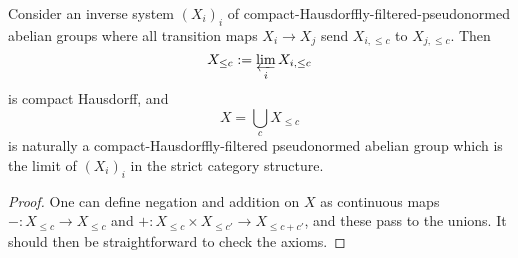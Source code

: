 \begin{proposition}
  \label{bounded-limits}
  \leanok
  Consider an inverse system $(X_i)_i$ of compact-Hausdorffly-filtered-pseudonormed abelian groups
  where all transition maps $X_i\to X_j$ send $X_{i,\leq c}$ to $X_{j,\leq c}$.
  Then
  \[ X_{\leq c} := \varprojlim_i X_{i,\leq c} \]
  is compact Hausdorff, and
  \[ X=\bigcup_c X_{\leq c} \]
  is naturally a compact-Hausdorffly-filtered pseudonormed abelian group
  which is the limit of $(X_i)_i$ in the strict category structure.
\end{proposition}

\begin{proof}
  One can define negation and addition on $X$ as continuous maps
  $-: X_{\leq c}\to X_{\leq c}$ and $+: X_{\leq c}\times X_{\leq c'}\to X_{\leq c+c'}$, and these pass to the unions.
  It should then be straightforward to check the axioms.
\end{proof}

